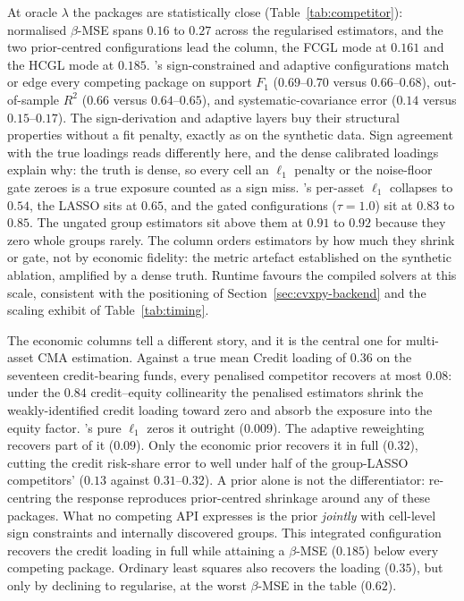 \documentclass[article]{jss}
\begin{document}
At oracle $\lambda$ the packages are statistically close
(Table~\ref{tab:competitor}): normalised $\beta$-MSE spans $0.16$ to
$0.27$ across the regularised estimators, and the two prior-centred
configurations lead the column, the FCGL mode at $0.161$ and the HCGL
mode at $0.185$.
's sign-constrained and adaptive configurations match
or edge every competing package on support $F_1$ ($0.69$--$0.70$ versus
$0.66$--$0.68$), out-of-sample $R^2$ ($0.66$ versus $0.64$--$0.65$), and
systematic-covariance error ($0.14$ versus $0.15$--$0.17$). The
sign-derivation and adaptive layers buy their structural properties
without a fit penalty, exactly as on the synthetic data. Sign agreement
with the true loadings reads differently here, and the dense calibrated
loadings explain why: the truth is dense, so every cell an $\ell_1$
penalty or the noise-floor gate zeroes is a true exposure counted as a
sign miss. 's per-asset $\ell_1$ collapses to
$0.54$, the  LASSO sits at $0.65$, and the gated
configurations ($\tau = 1.0$) sit at $0.83$ to $0.85$. The
ungated group estimators sit above them at $0.91$ to $0.92$
because they zero whole groups
rarely. The column orders estimators by how much they shrink or gate,
not by economic fidelity: the metric artefact established on the
synthetic ablation, amplified by a dense truth. Runtime favours the
compiled solvers at this scale, consistent with the 
positioning of Section~\ref{sec:cvxpy-backend} and the scaling exhibit
of Table~\ref{tab:timing}.

The economic columns tell a different story, and it is the central one
for multi-asset CMA estimation. Against a true mean Credit loading of
$0.36$ on the seventeen credit-bearing funds, every penalised competitor recovers
at most $0.08$: under the $0.84$ credit--equity collinearity the
penalised estimators shrink the weakly-identified credit loading toward
zero and absorb the exposure into the equity factor. 's
pure $\ell_1$ zeros it outright ($0.009$). The
adaptive reweighting recovers part of it ($0.09$). Only the economic
prior recovers it in full ($0.32$), cutting the credit risk-share error
to well under half of the group-LASSO competitors' ($0.13$ against
$0.31$--$0.32$). A prior
alone is not the differentiator: re-centring the response reproduces
prior-centred shrinkage around any of these packages. What no competing
API expresses is the prior \emph{jointly} with cell-level sign
constraints and internally discovered groups. This integrated
configuration recovers the credit loading in full while attaining a
$\beta$-MSE ($0.185$) below every competing package. Ordinary least
squares also recovers the loading ($0.35$), but only by declining to
regularise, at the worst $\beta$-MSE in the table ($0.62$).
\end{document}
